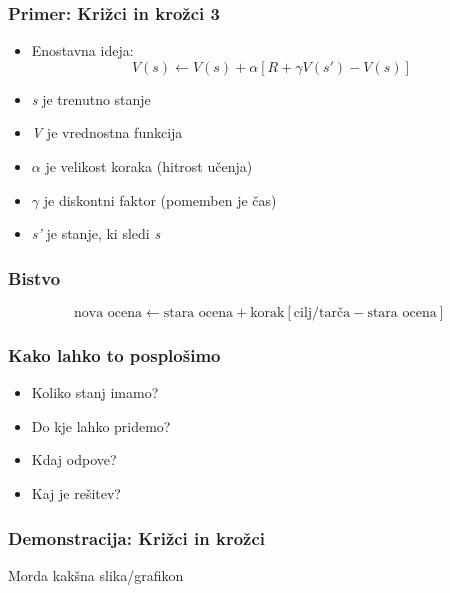 \documentclass{beamer}    %
\begin{document}
\begin{frame}
    \frametitle{Primer: Križci in krožci 3}
    \begin{itemize}
        \item Enostavna ideja:                                  \pause
        $$
        V(s) \leftarrow V(s) + \alpha [R + \gamma V(s') - V(s)]
        $$
                                                                \pause
        \item \textit{s} je trenutno stanje                     \pause
        \item \textit{V} je vrednostna funkcija                 \pause
        \item $\alpha$ je velikost koraka (hitrost učenja)      \pause
        \item $\gamma$ je diskontni faktor (pomemben je čas)    \pause
        \item \textit{s'} je stanje, ki sledi \textit{s}        
    \end{itemize}
\end{frame}


\begin{frame}
    \frametitle{Bistvo}
    $$
    \text{nova ocena} \leftarrow \text{stara ocena} + \text{korak} 
    [\text{cilj/tarča} - \text{stara ocena}]
    $$
\end{frame}


\begin{frame}
    \frametitle{Kako lahko to posplošimo}
    \begin{itemize}
        \item Koliko stanj imamo?
        \item Do kje lahko pridemo?
        \item Kdaj odpove?
        \item Kaj je rešitev?
    \end{itemize}
\end{frame}


\begin{frame}
    \frametitle{Demonstracija: Križci in krožci}
    Morda kakšna slika/grafikon
\end{frame}
\end{document}

